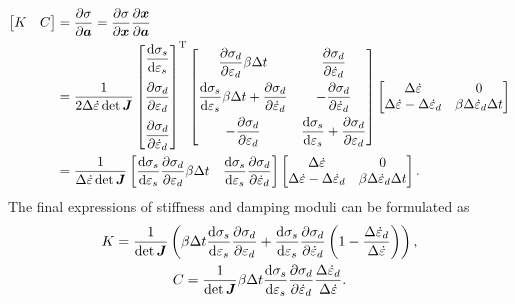 \begin{gather}
\begin{split}
\begin{bmatrix}
	K & C
\end{bmatrix}&=\dfrac{\partial\sigma}{\partial\bm{a}}=\dfrac{\partial\sigma}{\partial\bm{x}}\dfrac{\partial\bm{x}}{\partial\bm{a}}\\&=\dfrac{1}{2\Delta\dot\varepsilon\det{\bm{J}}}
\begin{bmatrix}
	\dfrac{\mathrm{d}\sigma_s}{\mathrm{d}\varepsilon_s}    \\[4mm]
	\dfrac{\partial\sigma_d}{\partial\varepsilon_d}     \\[4mm]
	\dfrac{\partial\sigma_d}{\partial\dot\varepsilon_d}
\end{bmatrix}^{\mathrm{T}}
\begin{bmatrix}
	\dfrac{\partial\sigma_d}{\partial\varepsilon_d}\beta\Delta{}t                                               & \dfrac{\partial\sigma_d}{\partial\dot\varepsilon_d}                                       \\[3mm]
	\dfrac{\mathrm{d}\sigma_s}{\mathrm{d}\varepsilon_s}\beta\Delta{}t+\dfrac{\partial\sigma_d}{\partial\dot\varepsilon_d} & -\dfrac{\partial\sigma_d}{\partial\dot\varepsilon_d}                                      \\[3mm]
	-\dfrac{\partial\sigma_d}{\partial\varepsilon_d}                                                            & \dfrac{\mathrm{d}\sigma_s}{\mathrm{d}\varepsilon_s}+\dfrac{\partial\sigma_d}{\partial\varepsilon_d}
\end{bmatrix}
\begin{bmatrix}
	\Delta\dot\varepsilon                         & 0                                     \\
	\Delta\dot\varepsilon-\Delta\dot\varepsilon_d & \beta\Delta\dot\varepsilon_d\Delta{}t
\end{bmatrix}\\&=\dfrac{1}{\Delta\dot\varepsilon\det{\bm{J}}}
\begin{bmatrix}
	\dfrac{\mathrm{d}\sigma_s}{\mathrm{d}\varepsilon_s}\dfrac{\partial\sigma_d}{\partial\varepsilon_d}\beta\Delta{}t & \dfrac{\mathrm{d}\sigma_s}{\mathrm{d}\varepsilon_s}\dfrac{\partial\sigma_d}{\partial\dot\varepsilon_d}
\end{bmatrix}
\begin{bmatrix}
	\Delta\dot\varepsilon                         & 0                                     \\
	\Delta\dot\varepsilon-\Delta\dot\varepsilon_d & \beta\Delta\dot\varepsilon_d\Delta{}t
\end{bmatrix}.
\end{split}
\end{gather}
The final expressions of stiffness and damping moduli can be formulated as
\begin{gather}
K=\dfrac{1}{\det{\bm{J}}}\left(\beta\Delta{}t\dfrac{\mathrm{d}\sigma_s}{\mathrm{d}\varepsilon_s}\dfrac{\partial\sigma_d}{\partial\varepsilon_d}+\dfrac{\mathrm{d}\sigma_s}{\mathrm{d}\varepsilon_s}\dfrac{\partial\sigma_d}{\partial\dot\varepsilon_d}\left(1-\dfrac{\Delta\dot\varepsilon_d}{\Delta\dot\varepsilon}\right)\right),\\
C=\dfrac{1}{\det{\bm{J}}}\beta\Delta{}t\dfrac{\mathrm{d}\sigma_s}{\mathrm{d}\varepsilon_s}\dfrac{\partial\sigma_d}{\partial\dot\varepsilon_d}\dfrac{\Delta\dot\varepsilon_d}{\Delta\dot\varepsilon}.
\end{gather}